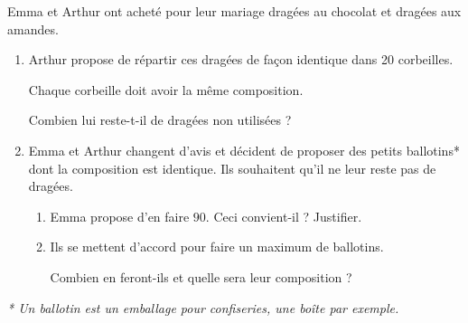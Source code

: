 
\medskip
 
Emma et Arthur ont acheté pour leur mariage  dragées au chocolat et  dragées aux amandes.

\medskip
 
\begin{enumerate}
\item Arthur propose de répartir ces dragées de façon identique dans 20 corbeilles.
 
Chaque corbeille doit avoir la même composition.
 
Combien lui reste-t-il de dragées non utilisées ? 
\item Emma et Arthur changent d'avis et décident de proposer des petits ballotins* dont la composition est identique. Ils souhaitent qu'il ne leur reste pas de dragées. 
	\begin{enumerate}
		\item Emma propose d'en faire $90$. Ceci convient-il ? Justifier. 
		\item Ils se mettent d'accord pour faire un maximum de ballotins.
		
Combien en feront-ils et quelle sera leur composition ? 

 
	\end{enumerate}
\end{enumerate}

\emph{* Un ballotin est un emballage pour confiseries, une boîte par exemple.}

\vspace{0,5cm}


